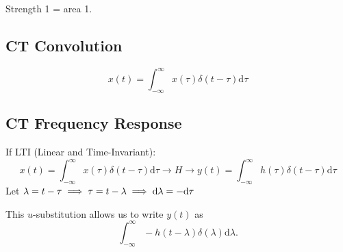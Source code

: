 Strength 1 = area 1.

\subsection{CT Convolution}
\[
    x(t) 
    = \int_{-\infty}^\infty x(\tau)\delta(t-\tau) \mathrm d\tau
\]

\subsection{CT Frequency Response}
If LTI (Linear and Time-Invariant):
\[
    x(t) 
    = \int_{-\infty}^\infty x(\tau)\delta(t-\tau) \mathrm d\tau
    \to
    \boxed{H}
    \to
    y(t) 
    = \int_{-\infty}^\infty h(\tau)\delta(t-\tau) \mathrm d\tau
\]
Let $\lambda = t - \tau 
\implies \tau=t-\lambda
\implies\mathrm{d}\lambda=-\mathrm{d}\tau$

This $u$-substitution allows us to write $y(t)$ as
$$
\int_{-\infty}^\infty -h(t-\lambda)\delta(\lambda) \mathrm d\lambda.
$$
